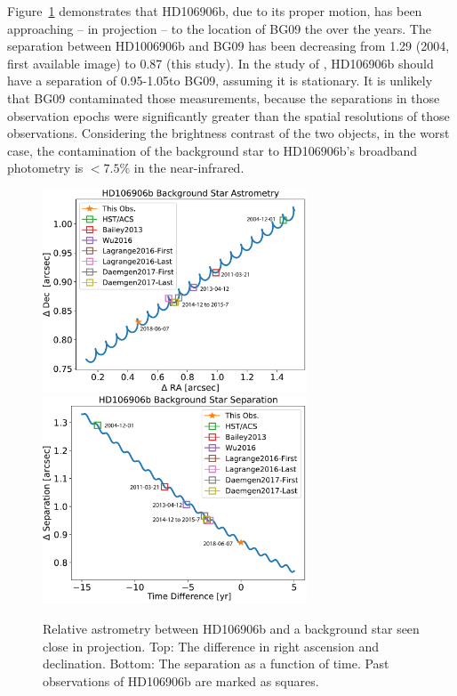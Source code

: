\documentclass[twocolumn]{aastex62}
\begin{document}
Figure~\ref{fig:astrometry:bck} demonstrates that HD106906b, due to its proper motion, has been approaching  -- in projection -- to {the location of BG09} the  over the years. The separation between HD1006906b and {BG09} has been decreasing from 1\arcsec.29 (2004, first available image) to 0\arcsec.87 (this study). In the study of \citep{Bailey2013, Wu2016, Daemgen2017},  HD106906b should have a separation of 0.95\arcsec{}-1.05\arcsec to {BG09}, assuming it is stationary. It is unlikely that {BG09} contaminated those measurements, because the separations in those observation epochs were significantly greater than the spatial resolutions of those observations. Considering the brightness contrast of the two objects, in the worst case, the contamination of the background star to HD106906b's broadband photometry is  $<7.5\%$ in the near-infrared. 

\begin{figure}[!ht]
  \centering
  \includegraphics[width=0.7\textwidth]{figures/bckStarDeltaRADEC.pdf} \includegraphics[width=0.7\textwidth]{figures/bckStarSeparation.pdf}
  \caption[Relative astrometry between HD106906b and a background star seen close in projection.]{Relative astrometry between HD106906b and a background star seen close in projection. Top: The difference in right ascension and declination. Bottom: The separation as a function of time. Past observations of HD106906b are marked as squares.}
  \label{fig:astrometry:bck}
\end{figure}
\end{document}

